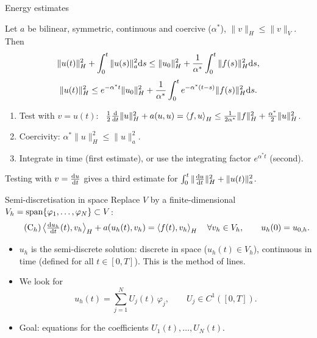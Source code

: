 \begin{frame}{Energy estimates}
  \begin{lemma}
    Let $a$ be bilinear, symmetric, continuous and coercive ($\alpha^*$), $\|v\|_H \le \|v\|_V$. Then
    \[
      \|u(t)\|_H^2 + \int_0^t \|u(s)\|_a^2 {\mathrm d} s \le \|u_0\|_H^2 + \frac 1 {\alpha^*} \int_0^t \|f(s)\|_H^2 {\mathrm d} s,
    \]
    \[
      \|u(t)\|_H^2 \le e^{-\alpha^* t} \|u_0\|_H^2 + \frac{1}{\alpha^*} \int_0^t e^{-\alpha^*(t-s)} \|f(s)\|_H^2 {\mathrm d} s.
    \]
  \end{lemma}
  \begin{proofsteps}
    \begin{enumerate}
      \item Test with $v = u(t)$: \
            $\frac 1 2 \frac{{\mathrm d}}{{\mathrm d} t}\|u\|_H^2 + a(u,u) = \left\langle f, u \right\rangle_H \le \frac{1}{2\alpha^*} \|f\|_H^2 + \frac{\alpha^*}{2}\|u\|_H^2$.
      \item Coercivity: $\alpha^* \|u\|_H^2 \le \|u\|_a^2$.
      \item Integrate in time (first estimate), or use the integrating factor $e^{\alpha^* t}$ (second).
    \end{enumerate}
  \end{proofsteps}
  {\small Testing with $v = \frac{{\mathrm d} u}{{\mathrm d} t}$ gives a third estimate for $\int_0^t \|\frac{{\mathrm d} u}{{\mathrm d} t}\|_H^2 + \|u(t)\|_a^2$.}
\end{frame}

\begin{frame}{Semi-discretisation in space}
  Replace $V$ by a finite-dimensional $V_h = \operatorname{span}\{\varphi_1, \dots, \varphi_N\} \subset V$:
  \[
    \tag{C$_h$}
    \left\langle \tfrac{{\mathrm d} u_h}{{\mathrm d} t}(t), v_h \right\rangle_H + a(u_h(t), v_h) = \left\langle f(t), v_h \right\rangle_H \quad \forall v_h \in V_h,
    \qquad u_h(0) = u_{0,h}.
  \]
  \begin{itemize}
    \item $u_h$ is the \alert{semi-discrete solution}: discrete in space ($u_h(t) \in V_h$), continuous in time (defined for all $t \in [0,T]$). This is the \alert{method of lines}.
    \item We look for
          \[
            u_h(t) = \sum_{j=1}^N U_j(t)\, \varphi_j, \qquad U_j \in C^1([0,T]).
          \]
    \item Goal: equations for the coefficients $U_1(t), \dots, U_N(t)$.
  \end{itemize}
\end{frame}

